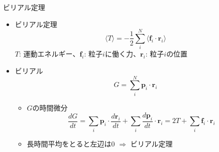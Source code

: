 
\begin{frame}[t,fragile]{ビリアル定理}
  \begin{itemize}
  \item ビリアル定理
    \[
    \langle T \rangle = -\frac{1}{2} \sum_i^N \langle \mathbf{f}_i \cdot \mathbf{r}_i \rangle
    \]
    $T$: 運動エネルギー、$\mathbf{f}_i$: 粒子$i$に働く力、$\mathbf{r}_i$: 粒子$i$の位置
  \item ビリアル
    \[
    G = \sum_i^N \mathbf{p}_i \cdot \mathbf{r}_i
    \]
    \begin{itemize}
    \item $G$の時間微分
      \[
      \frac{dG}{dt} = \sum_i \mathbf{p}_i \cdot \frac{d\mathbf{r}_i}{dt} + \sum_i \frac{d\mathbf{p}_i}{dt} \cdot \mathbf{r}_i = 2 T + \sum_i \mathbf{f}_i \cdot \mathbf{r}_i
      \]
    \item 長時間平均をとると左辺は0 $\Rightarrow$ ビリアル定理
    \end{itemize}
  \end{itemize}
\end{frame}

